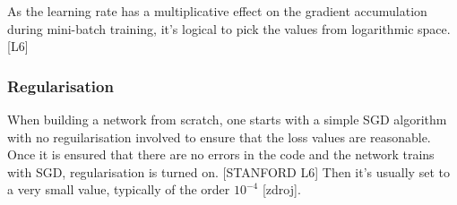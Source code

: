 As the learning rate has a multiplicative effect on the gradient accumulation during mini-batch training, it's logical to pick the values from logarithmic space. [L6]

\subsubsection{Regularisation}

When building a network from scratch, one starts with a simple SGD algorithm with no reguilarisation involved to ensure that the loss values are reasonable. Once it is ensured that there are no errors in the code and the network trains with SGD, regularisation is turned on. [STANFORD L6] Then it's usually set to a very small value, typically of the order $ 10^{-4} $ [zdroj].



